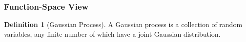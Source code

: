 \documentclass[12pt,a4paper]{report}
\theoremstyle{definition}
\newtheorem{definition}{Definition}[section]
\begin{document}
%
%
%
%
%
%
%
%
%
%

\subsubsection{Function-Space View}

\begin{definition}[Gaussian Process]
A Gaussian process is a collection of random variables, any finite number of which have a joint Gaussian distribution. 
\end{definition}
\end{document}
